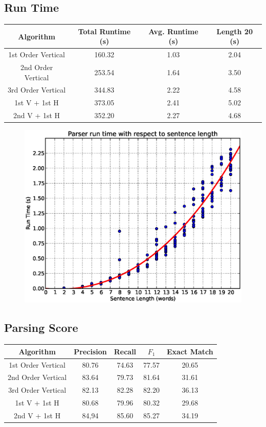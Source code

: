 \documentclass[12pt]{article}
\begin{document}
\subsection{Run Time}
\begin{center}
\begin{tabular}{|c|c|c|c|}
\hline
Algorithm & Total Runtime (s) & Avg. Runtime (s) & Length 20 (s)\\\hline
1st Order Vertical & 160.32 & 1.03 & 2.04 \\\hline
2nd Order Vertical & 253.54 & 1.64 & 3.50 \\\hline
3rd Order Vertical & 344.83  & 2.22 & 4.58 \\\hline
1st V + 1st H & 373.05 & 2.41 & 5.02 \\\hline
2nd V + 1st H & 352.20 & 2.27 & 4.68 \\\hline
\end{tabular}
\end{center}
\begin{figure}[H]
\centering
\includegraphics[width=0.5\linewidth]{./stats/runtime}
\end{figure}
\subsection{Parsing Score}
\begin{center}
\begin{tabular}{|c|c|c|c|c|}
\hline
Algorithm & Precision & Recall & $F_1$ & Exact Match \\\hline
1st Order Vertical & 80.76 & 74.63 & 77.57 & 20.65\\\hline
2nd Order Vertical & 83.64 & 79.73 & 81.64 & 31.61 \\\hline
3rd Order Vertical & 82.13 & 82.28 & 82.20 & 36.13 \\\hline
1st V + 1st H & 80.68 & 79.96 & 80.32 & 29.68 \\\hline
2nd V + 1st H & 84,94 & 85.60 & 85.27 & 34.19 \\\hline
\end{tabular}
\end{center}
\end{document}

